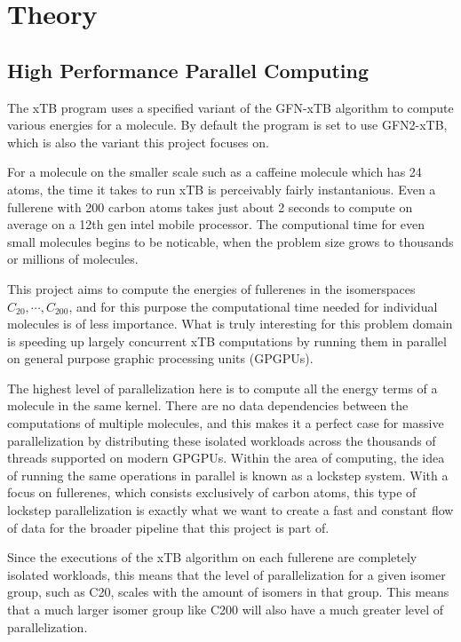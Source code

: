 \section{Theory}

\subsection{High Performance Parallel Computing}

The xTB program uses a specified variant of the GFN-xTB algorithm to compute various energies for a molecule. By default the program is set to use GFN2-xTB, which is also the variant this project focuses on.

For a molecule on the smaller scale such as a caffeine molecule which has 24 atoms, the time it takes to run xTB is perceivably fairly instantanious. Even a fullerene with 200 carbon atoms takes just about 2 seconds to compute on average on a 12th gen intel mobile processor. The computional time for even small molecules begins to be noticable, when the problem size grows to thousands or millions of molecules.

This project aims to compute the energies of fullerenes in the isomerspaces \(C_{20}, \cdots, C_{200} \), and for this purpose the computational time needed for individual molecules is of less importance. What is truly interesting for this problem domain is speeding up largely concurrent xTB computations by running them in parallel on general purpose graphic processing units (GPGPUs).

The highest level of parallelization here is to compute all the energy terms of a molecule in the same kernel. There are no data dependencies between the computations of multiple molecules, and this makes it a perfect case for massive parallelization by distributing these isolated workloads across the thousands of threads supported on modern GPGPUs.
Within the area of computing, the idea of running the same operations in parallel is known as a lockstep system. With a focus on fullerenes, which consists exclusively of carbon atoms, this type of lockstep parallelization is exactly what we want to create a fast and constant flow of data for the broader pipeline that this project is part of.

Since the executions of the xTB algorithm on each fullerene are completely isolated workloads, this means that the level of parallelization for a given isomer group, such as C20, scales with the amount of isomers in that group. This means that a much larger isomer group like C200 will also have a much greater level of parallelization.

